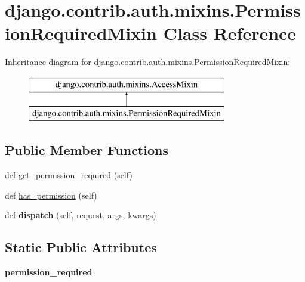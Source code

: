 \hypertarget{classdjango_1_1contrib_1_1auth_1_1mixins_1_1_permission_required_mixin}{}\section{django.\+contrib.\+auth.\+mixins.\+Permission\+Required\+Mixin Class Reference}
\label{classdjango_1_1contrib_1_1auth_1_1mixins_1_1_permission_required_mixin}
Inheritance diagram for django.\+contrib.\+auth.\+mixins.\+Permission\+Required\+Mixin\+:\begin{figure}[H]
\begin{center}
\leavevmode
\includegraphics[height=2.000000cm]{classdjango_1_1contrib_1_1auth_1_1mixins_1_1_permission_required_mixin}
\end{center}
\end{figure}
\subsection*{Public Member Functions}
\begin{DoxyCompactItemize}
\item 
def \mbox{\hyperlink{classdjango_1_1contrib_1_1auth_1_1mixins_1_1_permission_required_mixin_ad90f009d6921ee27a5edc6eb7d3f7c23}{get\+\_\+permission\+\_\+required}} (self)
\item 
def \mbox{\hyperlink{classdjango_1_1contrib_1_1auth_1_1mixins_1_1_permission_required_mixin_a2809e8d2b78dee31ff0953c9e8852f26}{has\+\_\+permission}} (self)
\item 
\mbox{\label{classdjango_1_1contrib_1_1auth_1_1mixins_1_1_permission_required_mixin_afd3b25357b5002c76f7cb75ccc983657}} 
def {\bfseries dispatch} (self, request, args, kwargs)
\end{DoxyCompactItemize}
\subsection*{Static Public Attributes}
\begin{DoxyCompactItemize}
\item 
\mbox{\label{classdjango_1_1contrib_1_1auth_1_1mixins_1_1_permission_required_mixin_a18be7a0bfc333bfb1a73c470914036cd}} 
{\bfseries permission\+\_\+required}
\end{DoxyCompactItemize}


